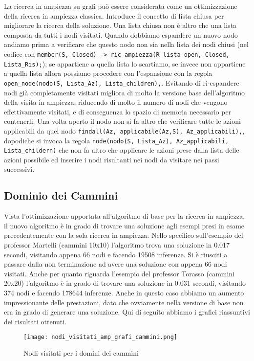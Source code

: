 La ricerca in ampiezza su grafi può essere considerata come un ottimizzazione della ricerca in ampiezza classica. Introduce il concetto di lista chiusa per migliorare la ricerca della soluzione. Una lista chiusa non è altro che una lista composta da tutti i nodi visitati. Quando
dobbiamo espandere un nuovo nodo andiamo prima a verificare che questo nodo non sia nella lista dei nodi chiusi (nel codice con \lstinline{member(S, Closed) -> ric_ampiezza(R_lista_open, Closed, Lista_Ris);}); se appartiene a quella lista lo scartiamo, se invece non appartiene a quella lista allora possiamo procedere con l'espansione con la regola  \lstinline{open_node(nodo(S, Lista_Az), Lista_children),}.
Evitando di ri-espandere nodi già completamente visitati migliora di molto la versione base dell'algoritmo della visita in ampiezza, riducendo di molto il numero di nodi che vengono effettivamente visitati, e di conseguenza lo spazio di memoria necessario per contenerli. Una volta aperto il nodo non si fa altro che verificare tutte le azioni applicabili da quel nodo \lstinline{findall(Az, applicabile(Az,S), Az_applicabili),}, dopodiche si invoca la regola \lstinline{node(nodo(S, Lista_Az), Az_applicabili, Lista_childern)} che non fa altro che applicare le azioni prese dalla lista delle azioni possibile ed inserire i nodi risultanti nei nodi da visitare nei passi successivi.

\subsection{Dominio dei Cammini}
Vista l'ottimizzazione apportata all'algoritmo di base per la ricerca in ampiezza, il nuovo algoritmo è in grado di trovare una soluzione agli esempi presi in esame precedentemente con la sola ricerca in ampiezza. Nello specifico sull'esempio del professor Martelli (cammini 10x10) l'algoritmo trova una soluzione in 0.017 secondi, visitando appena 66 nodi e facendo 19508 inferenze. Si è riusciti a passare dalla non terminazione ad avere una soluzione con appena 66 nodi visitati. Anche per quanto riguarda l'esempio del professor Torasso (cammini 20x20) l'algoritmo è in grado di trovare una soluzione in 0.031 secondi, visitando 374 nodi e facendo 178644 inferenze. Anche in questo caso abbiamo un aumento impressionante delle prestazioni, dato che ovviamente nella versione di base non era in grado di generare una soluzione.
Qui di seguito abbiamo i grafici riassuntivi dei risultati ottenuti.

\begin{figure}[htp]
  \texttt{[image: nodi\_visitati\_amp\_grafi\_cammini.png]}
  \caption{Nodi visitati per i domini dei cammini}
  \label{fig:figure1}
\end{figure}

